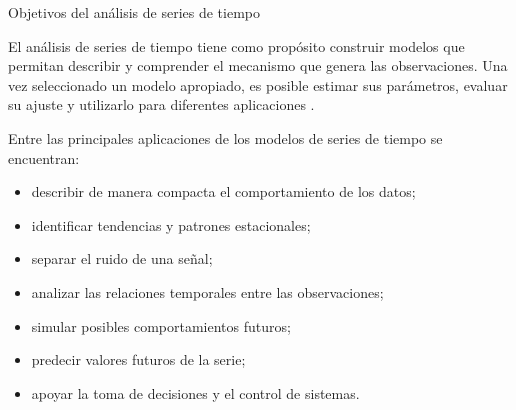 Objetivos del análisis de series de tiempo

El análisis de series de tiempo tiene como propósito construir modelos que permitan describir y comprender el mecanismo que genera las observaciones. Una vez seleccionado un modelo apropiado, es posible estimar sus parámetros, evaluar su ajuste y utilizarlo para diferentes aplicaciones \cite{brockwell2016introduction}.

Entre las principales aplicaciones de los modelos de series de tiempo se encuentran:

\begin{itemize}
    \item describir de manera compacta el comportamiento de los datos;
    \item identificar tendencias y patrones estacionales;
    \item separar el ruido de una señal;
    \item analizar las relaciones temporales entre las observaciones;
    \item simular posibles comportamientos futuros;
    \item predecir valores futuros de la serie;
    \item apoyar la toma de decisiones y el control de sistemas.
\end{itemize}
